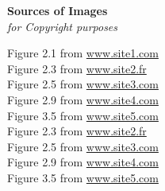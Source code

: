 \begin{landscape}
	\thispagestyle{empty}
	\begin{center}
		\Huge{\textbf{Sources of Images}} \\
		\normalsize{\textit{for Copyright purposes}}
	\end{center}
	Figure 2.1 from \url{www.site1.com} \\
	Figure 2.3 from \url{www.site2.fr} \\
	Figure 2.5 from \url{www.site3.com} \\
	Figure 2.9 from \url{www.site4.com} \\
	Figure 3.5 from \url{www.site5.com} \\
	Figure 2.3 from \url{www.site2.fr} \\
	Figure 2.5 from \url{www.site3.com} \\
	Figure 2.9 from \url{www.site4.com} \\
	Figure 3.5 from \url{www.site5.com} \\
\end{landscape}
